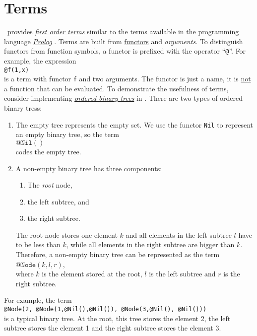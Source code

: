 \section{Terms}
\setlx\ provides 
\href{http://en.wikipedia.org/wiki/Term_(first-order_logic)#Terms}{\emph{first order terms}}
similar to the terms available in the programming language 
\href{http://en.wikipedia.org/wiki/Prolog}{\emph{Prolog}} \cite{sterling:94}.
Terms are built from \href{https://en.wikipedia.org/wiki/Prolog_syntax_and_semantics}{functors} 
and \emph{arguments}.  To distinguish functors from function
symbols, a functor is prefixed with the operator ``\texttt{@}''.  For example, the expression
\\[0.2cm]
\hspace*{1.3cm}
\texttt{@f(1,x)}
\\[0.2cm]
is a term with functor \texttt{f} and two arguments.  The functor is just a name, it is 
\underline{not} a function that can be evaluated.  To demonstrate the usefulness of terms, consider
implementing \href{http://en.wikipedia.org/wiki/Binary_search_tree}{\emph{ordered binary trees}} in \setlx. 
There are two types of ordered binary tress:
\begin{enumerate}
\item The empty tree represents the empty set.  We use the functor \texttt{Nil} to represent an
      empty binary tree, so the term
      \\[0.2cm]
      \hspace*{1.3cm}
      $\mathtt{@Nil()}$
      \\[0.2cm]
      codes the empty tree.
\item A non-empty binary tree has three components:
      \begin{enumerate}
      \item The \emph{root} node,
      \item the left subtree, and
      \item the right subtree.
      \end{enumerate}
      The root node stores one element $k$ and all elements in the left subtree $l$ have to be less
      than $k$, while all elements in the right subtree are bigger than $k$.  Therefore, a non-empty
      binary tree can be represented as the term
      \\[0.2cm]
      \hspace*{1.3cm}
      $\texttt{@Node}(k, l, r)$,
      \\[0.2cm]
      where $k$ is the element stored at the root, $l$ is the left subtree and $r$ is the right subtree.
\end{enumerate}
For example, the term
\\[0.2cm]
\hspace*{1.3cm}
\texttt{@Node(2, @Node(1,@Nil(),@Nil()), @Node(3,@Nil(), @Nil()))}
\\[0.2cm]
is a typical binary tree.  At the root, this tree stores the element 2, the left subtree
stores the element 1 and the right subtree stores the element 3.

